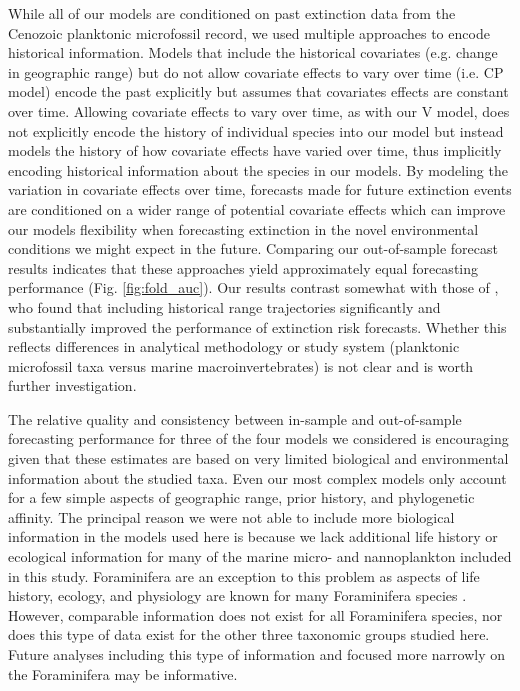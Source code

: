 \documentclass[12pt,letterpaper]{article}
\begin{document}
\begin{refsection}
While all of our models are conditioned on past extinction data from the Cenozoic planktonic microfossil record, we used multiple approaches to encode historical information. Models that include the historical covariates (e.g. change in geographic range) but do not allow covariate effects to vary over time (i.e. CP model) encode the past explicitly but assumes that covariates effects are constant over time. Allowing covariate effects to vary over time, as with our V model, does not explicitly encode the history of individual species into our model but instead models the history of how covariate effects have varied over time, thus implicitly encoding historical information about the species in our models. By modeling the variation in covariate effects over time, forecasts made for future extinction events are conditioned on a wider range of potential covariate effects which can improve our models flexibility when forecasting extinction in the novel environmental conditions we might expect in the future. Comparing our out-of-sample forecast results indicates that these approaches yield approximately equal forecasting performance (Fig. \ref{fig:fold_auc}). Our results contrast somewhat with those of \citet{Kiessling2016}, who found that including historical range trajectories significantly and substantially improved the performance of extinction risk forecasts. Whether this reflects differences in analytical methodology or study system (planktonic microfossil taxa versus marine macroinvertebrates) is not clear and is worth further investigation.

The relative quality and consistency between in-sample and out-of-sample forecasting performance for three of the four models we considered is encouraging given that these estimates are based on very limited biological and environmental information about the studied taxa. Even our most complex models only account for a few simple aspects of geographic range, prior history, and phylogenetic affinity. The principal reason we were not able to include more biological information in the models used here is because we lack additional life history or ecological information for many of the marine micro- and nannoplankton included in this study. Foraminifera are an exception to this problem as aspects of life history, ecology, and physiology are known for many Foraminifera species \citep{Ezard2011}. However, comparable information does not exist for all Foraminifera species, nor does this type of data exist for the other three taxonomic groups studied here. Future analyses including this type of information and focused more narrowly on the Foraminifera may be informative. 


\end{refsection}
\end{document}
